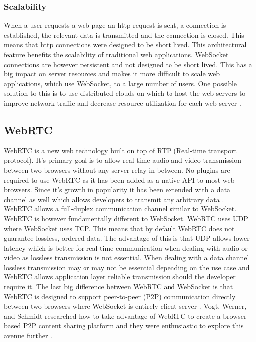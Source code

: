 \documentclass[prodmode,acmtecs]{acmsmall}
\begin{document}
\subsubsection{Scalability}
When a user requests a web page an http request is sent, a connection is established, the relevant data is transmitted and the connection is closed. This means that http connections were designed to be short lived. This architectural feature benefits the scalability of traditional web applications. WebSocket connections are however persistent and not designed to be short lived. This has a big impact on server resources and makes it more difficult to scale web applications, which use WebSocket, to a large number of users. One possible solution to this is to use distributed clouds on which to host the web servers to improve network traffic and decrease resource utilization for each web server \cite{solomon2012distributed}. 



\subsection{WebRTC}
WebRTC is a new web technology built on top of RTP (Real-time transport protocol). It's primary goal is to allow real-time audio and video transmission between two browsers without any server relay in between. No plugins are required to use WebRTC as it has been added as a native API to most web browsers. Since it's growth in popularity it has been extended with a data channel as well which allows developers to transmit any arbitrary data \cite{karadogan2014evaluating}.\\

WebRTC allows a full-duplex communication channel similar to WebSocket. WebRTC is however fundamentally different to WebSocket. WebRTC uses UDP where WebSocket uses TCP. This means that by default WebRTC does not guarantee lossless, ordered data. The advantage of this is that UDP allows lower latency which is better for real-time communication when dealing with audio or video as lossless transmission is not essential. When dealing with a data channel lossless transmission may or may not be essential depending on the use case and WebRTC allows application layer reliable transmission should the developer require it. The last big difference between WebRTC and WebSocket is that WebRTC is designed to support peer-to-peer (P2P) communication directly between two browsers where WebSocket is entirely client-server \cite{karadogan2014evaluating}. Vogt, Werner, and Schmidt researched how to take advantage of WebRTC to create a browser based P2P content sharing platform and they were enthusiastic to explore this avenue further \cite{vogt2013leveraging}.
\end{document}
